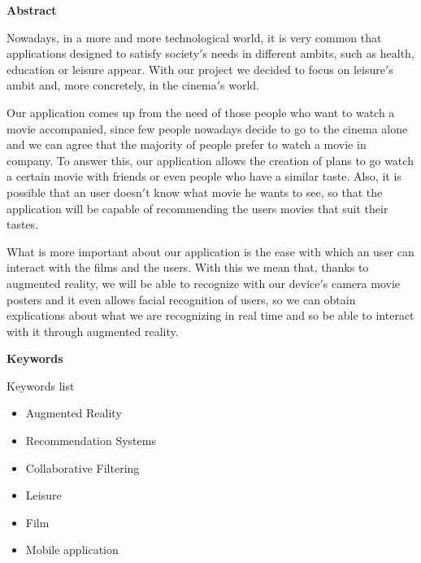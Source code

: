 
\newpage

\thispagestyle{empty}

\begin{center}

{\bf \Huge Abstract}

  \end{center}
\vspace{1cm}

Nowadays, in a more and more technological world, it is very common that applications designed to satisfy society$'$s needs in different ambits, such as health, education or leisure appear.
With our project we decided to focus on leisure$'$s ambit and, more concretely, in the cinema$'$s world.

  Our application comes up from the need of those people who want to watch a movie accompanied, since few people nowadays decide to go to the cinema alone and we can agree that the majority of people prefer to watch a movie in company.
To answer this, our application allows the creation of plans to go watch a certain movie with friends or even people who have a similar taste. Also, it is possible that an user doesn$'$t know what movie he wants to see, so that the application will be capable of recommending the users movies that
suit their tastes.

  What is more important about our application is the ease with which an user can interact with the films and the users. With this we mean that, thanks to augmented reality, we will be able to recognize with our device$'$s camera movie posters and it even
allows facial recognition of users, so we can obtain explications about what we are recognizing in real time and so be able to interact with it through augmented reality.

\vspace{1cm}

\begin{center}

  {\bf \Large Keywords}
  
     \end{center}
  
     \vspace{0.5cm}
     
     Keywords list
     \begin{itemize}  
      \item Augmented Reality
      \item Recommendation Systems
      \item Collaborative Filtering
      \item Leisure
      \item Film
      \item Mobile application
    \end{itemize}
   


